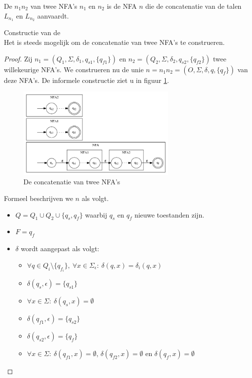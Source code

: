 \documentclass[main.tex]{subfiles}
\begin{document}
\begin{de}
  De  $n_{1}n_{2}$ van twee NFA's $n_{1}$ en $n_{2}$ is de NFA $n$ die de concatenatie van de talen $L_{n_{1}}$ en $L_{n_{2}}$ aanvaardt.
\end{de}

\begin{st}
  Constructie van de \\
  Het is steeds mogelijk om de concatenatie van twee NFA's te construeren.

  \begin{proof}
    Zij $n_{1} = (Q_{1},\Sigma,\delta_{1},q_{s1},\{q_{f1}\})$ en $n_{2} = (Q_{2},\Sigma,\delta_{2},q_{s2},\{q_{f2}\})$ twee willekeurige NFA's. We construeren nu de unie $n = n_{1}n_{2} = (O,\Sigma,\delta,q,\{q_{f}\})$ van deze NFA's.
    De informele constructie ziet u in figuur \ref{fig:nfa_concat}.
    \begin{figure}[H]
      \centering
      \includegraphics[width=0.7\textwidth]{assets/nfa_concat.png}      
      \caption{De concatenatie van twee NFA's}
      \label{fig:nfa_concat}
    \end{figure}
    Formeel beschrijven we $n$ als volgt.
    \begin{itemize}
    \item $Q = Q_{1} \cup Q_{2} \cup \{ q_{s}, q_{f} \}$ waarbij $q_{s}$ en $q_{f}$ nieuwe toestanden zijn.
    \item $F = {q_{f}}$
    \item $\delta$ wordt aangepast als volgt:
      \begin{itemize}
      \item $\forall q \in Q_{i}\setminus\{q_{f_{i}}\},\ \forall x \in \Sigma_{\epsilon}:\ \delta(q,x) = \delta_{i}(q,x)$
      \item $\delta(q_{s},\epsilon) = \{q_{s1}\}$
      \item $\forall x \in \Sigma:\ \delta(q_{s},x) = \emptyset$
      \item $\delta(q_{f1},\epsilon) = \{q_{s2}\}$
      \item $\delta(q_{s2},\epsilon) = \{q_{f}\}$
      \item $\forall x \in \Sigma:\ \delta(q_{f1},x) = \emptyset$, $\delta(q_{f2},x) = \emptyset$ en $\delta(q_{f},x) = \emptyset$ 
      \end{itemize}
    \end{itemize}
  \end{proof}
\end{st}
\end{document}
